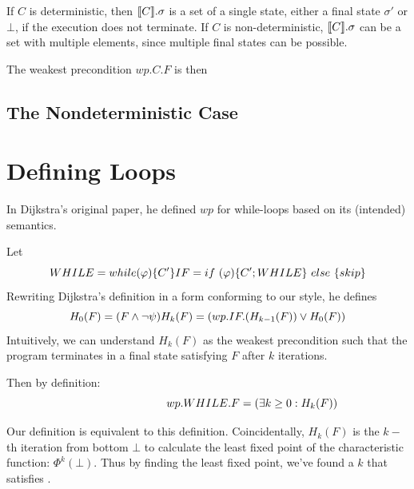 If $C$ is deterministic, then $\llbracket {C} \rrbracket.\sigma$ is a set of a single state, either a final state $\sigma'$ or $\bot$, if the execution does not terminate. 
If $C$ is non-deterministic, $\llbracket {C} \rrbracket.\sigma$ can be a set with multiple elements, since multiple final states can be possible. 

The weakest precondition $wp.C.F$ is then 


\subsection{The Nondeterministic Case}\label{sec:wp-nondet}

\section{Defining Loops}
In Dijkstra's original paper\cite{dijkstra75}, he defined $wp$ for while-loops based on its (intended) semantics. 

Let 
\[
WHILE=while(\varphi)\{C'\}
\\ 
IF=  if\ (\varphi)\{C';WHILE\}\ else\ \{skip\}
\] 
Rewriting Dijkstra's definition in a form conforming to our style, he defines 
\[
H_0(F)=(F \wedge \neg \psi )
\\
H_k(F)=(wp.IF.(H_{k-1}(F)) \vee H_0(F))
\]
Intuitively, we can understand $H_k(F)$ as the weakest precondition such that the program terminates in a final state satisfying $F$ after  $k$ iterations. 

Then by definition: 
\begin{equation}
\hspace{2.8cm} wp.WHILE.F=(\exists k\geq 0: H_k(F))  \label{eq:while}
\end{equation}



Our definition is equivalent to this definition. 
Coincidentally, $H_k(F)$ is the $k-$th iteration from bottom $\bot$ to calculate the least fixed point of the characteristic function: $\Phi^k(\bot)$. 
Thus by finding the least fixed point, we've found a $k$ that satisfies . 

